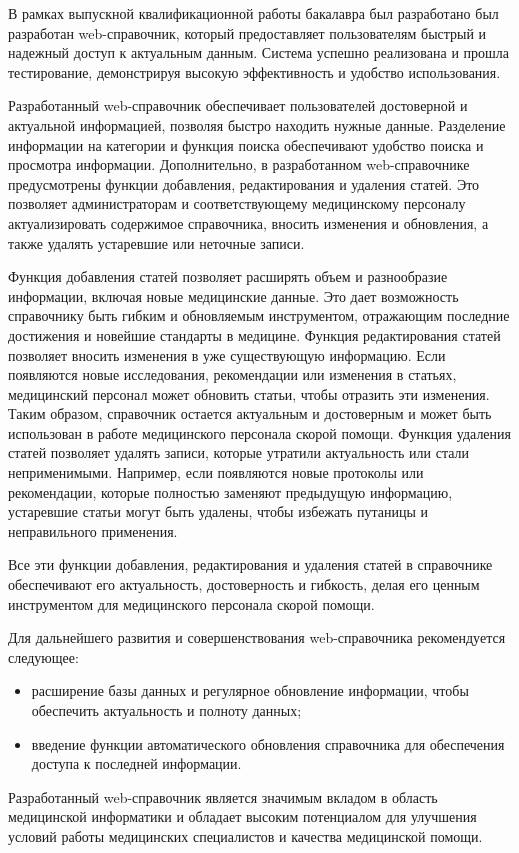 \conclusion

В рамках выпускной квалификационной работы бакалавра был разработано был разработан web-справочник, который предоставляет пользователям быстрый и надежный доступ к актуальным данным. Система успешно реализована и прошла тестирование, демонстрируя высокую эффективность и удобство использования.

Разработанный web-справочник обеспечивает пользователей достоверной и актуальной информацией, позволяя быстро находить нужные данные. Разделение информации на категории и функция поиска обеспечивают удобство поиска и просмотра информации.  Дополнительно, в разработанном web-справочнике предусмотрены функции добавления, редактирования и удаления статей. Это позволяет администраторам и соответствующему медицинскому персоналу актуализировать содержимое справочника, вносить изменения и обновления, а также удалять устаревшие или неточные записи.

Функция добавления статей позволяет расширять объем и разнообразие информации, включая новые медицинские данные. Это дает возможность справочнику быть гибким и обновляемым инструментом, отражающим последние достижения и новейшие стандарты в медицине. Функция редактирования статей позволяет вносить изменения в уже существующую информацию. Если появляются новые исследования, рекомендации или изменения в статьях, медицинский персонал может обновить статьи, чтобы отразить эти изменения. Таким образом, справочник остается актуальным и достоверным и может быть использован в работе медицинского персонала скорой помощи. Функция удаления статей позволяет удалять записи, которые утратили актуальность или стали неприменимыми. Например, если появляются новые протоколы или рекомендации, которые полностью заменяют предыдущую информацию, устаревшие статьи могут быть удалены, чтобы избежать путаницы и неправильного применения.

Все эти функции добавления, редактирования и удаления статей в справочнике обеспечивают его актуальность, достоверность и гибкость, делая его ценным инструментом для медицинского персонала скорой помощи.

Для дальнейшего развития и совершенствования web-справочника рекомендуется следующее:
\begin{itemize}
    \item расширение базы данных и регулярное обновление информации, чтобы обеспечить актуальность и полноту данных;
    \item введение функции автоматического обновления справочника для обеспечения доступа к последней информации.
\end{itemize}

Разработанный web-справочник является значимым вкладом в область медицинской информатики и обладает высоким потенциалом для улучшения условий работы медицинских специалистов и качества медицинской помощи.